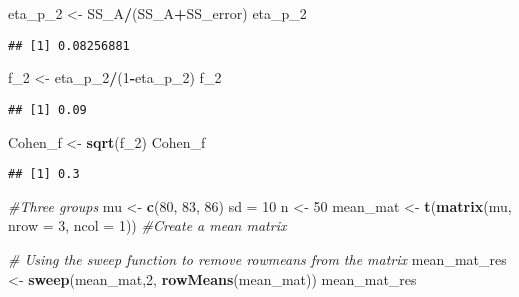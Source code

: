 \documentclass[]{article}
\newenvironment{Shaded}{\begin{snugshade}}{\end{snugshade}}
\newcommand{\KeywordTok}[1]{\textcolor[rgb]{0.13,0.29,0.53}{\textbf{#1}}}
\newcommand{\DataTypeTok}[1]{\textcolor[rgb]{0.13,0.29,0.53}{#1}}
\newcommand{\DecValTok}[1]{\textcolor[rgb]{0.00,0.00,0.81}{#1}}
\newcommand{\StringTok}[1]{\textcolor[rgb]{0.31,0.60,0.02}{#1}}
\newcommand{\CommentTok}[1]{\textcolor[rgb]{0.56,0.35,0.01}{\textit{#1}}}
\newcommand{\OperatorTok}[1]{\textcolor[rgb]{0.81,0.36,0.00}{\textbf{#1}}}
\newcommand{\NormalTok}[1]{#1}
\begin{document}
\begin{Shaded}
\begin{Highlighting}[]
\NormalTok{eta_p_}\DecValTok{2}\NormalTok{ <-}\StringTok{ }\NormalTok{SS_A}\OperatorTok{/}\NormalTok{(SS_A}\OperatorTok{+}\NormalTok{SS_error)}
\NormalTok{eta_p_}\DecValTok{2}
\end{Highlighting}
\end{Shaded}

\begin{verbatim}
## [1] 0.08256881
\end{verbatim}

\begin{Shaded}
\begin{Highlighting}[]
\NormalTok{f_}\DecValTok{2}\NormalTok{ <-}\StringTok{ }\NormalTok{eta_p_}\DecValTok{2}\OperatorTok{/}\NormalTok{(}\DecValTok{1}\OperatorTok{-}\NormalTok{eta_p_}\DecValTok{2}\NormalTok{)}
\NormalTok{f_}\DecValTok{2}
\end{Highlighting}
\end{Shaded}

\begin{verbatim}
## [1] 0.09
\end{verbatim}

\begin{Shaded}
\begin{Highlighting}[]
\NormalTok{Cohen_f <-}\StringTok{ }\KeywordTok{sqrt}\NormalTok{(f_}\DecValTok{2}\NormalTok{)}
\NormalTok{Cohen_f}
\end{Highlighting}
\end{Shaded}

\begin{verbatim}
## [1] 0.3
\end{verbatim}

\begin{Shaded}
\begin{Highlighting}[]
\CommentTok{#Three groups}
\NormalTok{mu <-}\StringTok{ }\KeywordTok{c}\NormalTok{(}\DecValTok{80}\NormalTok{, }\DecValTok{83}\NormalTok{, }\DecValTok{86}\NormalTok{)}
\NormalTok{sd =}\StringTok{ }\DecValTok{10}
\NormalTok{n <-}\StringTok{ }\DecValTok{50}
\NormalTok{mean_mat <-}\StringTok{ }\KeywordTok{t}\NormalTok{(}\KeywordTok{matrix}\NormalTok{(mu, }
                     \DataTypeTok{nrow =} \DecValTok{3}\NormalTok{,}
                     \DataTypeTok{ncol =} \DecValTok{1}\NormalTok{)) }\CommentTok{#Create a mean matrix}

\CommentTok{# Using the sweep function to remove rowmeans from the matrix}
\NormalTok{mean_mat_res <-}\StringTok{ }\KeywordTok{sweep}\NormalTok{(mean_mat,}\DecValTok{2}\NormalTok{, }\KeywordTok{rowMeans}\NormalTok{(mean_mat))   }
\NormalTok{mean_mat_res}
\end{Highlighting}
\end{Shaded}
\end{document}

